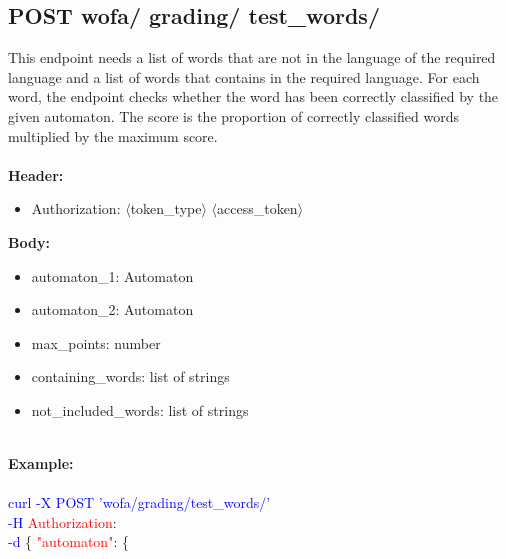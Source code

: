 \subsection{POST wofa/ grading/ test\_words/}
This endpoint needs a list of words that are not in the language of the required language and a list of words that contains in the required language. For each word, the endpoint checks whether the word has been correctly classified by the given automaton. The score is the proportion of correctly classified words multiplied by the maximum score.\\
\ \\
\textbf{Header:}
\begin{itemize}
    \item Authorization: $\langle$token\_type$\rangle$ $\langle$access\_token$\rangle$
\end{itemize}
\textbf{Body:}
\begin{itemize}
     \item automaton\_1: Automaton
    \item automaton\_2: Automaton
    \item max\_points: number
    \item containing\_words: list of strings
    \item not\_included\_words: list of strings
\end{itemize}
\ \\
\textbf{Example:} \\
\ \\
\textcolor{blue}{curl -X POST '\BaseURL wofa/grading/test\_words/'\\
-H} \textcolor{red}{Authorization}: \Auth \\
\textcolor{blue}{-d} \{ 
\textcolor{red}{"automaton"}: \{ 
